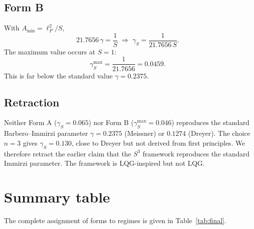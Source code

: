\documentclass[a4paper,7pt,oneside,openany]{book}
\begin{document}
\subsection{Form B}

With $A_{\text{min}}=\ell_{P}^{2}/S$,
\begin{equation}
21.7656\,\gamma=\frac{1}{S}
\;\Longrightarrow\;
\gamma_{S}=\frac{1}{21.7656\,S}.
\label{eq:gamma-B}
\end{equation}
The maximum value occurs at $S=1$:
\begin{equation}
\gamma_{S}^{\max}=\frac{1}{21.7656}=0.0459.
\label{eq:gamma-Bmax}
\end{equation}
This is far below the standard value $\gamma=0.2375$.

\subsection{Retraction}

Neither Form A ($\gamma_{S}=0.065$) nor Form B 
($\gamma_{S}^{\max}=0.046$) reproduces the standard 
Barbero--Immirzi parameter $\gamma=0.2375$ (Meissner) or 
$0.1274$ (Dreyer). The choice $n=3$ gives $\gamma_{S}=0.130$, 
close to Dreyer but not derived from first principles. We 
therefore retract the earlier claim that the $S^{3}$ framework 
reproduces the standard Immirzi parameter. The framework is 
LQG-inspired but not LQG.

\section{Summary table}

The complete assignment of forms to regimes is given in 
Table~\ref{tab:final}.
\end{document}
